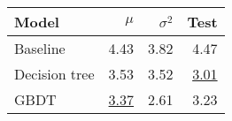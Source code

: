 \begin{tabular}{lrrr}
  \toprule
  Model         & $\mu$            & $\sigma^2$ & Test
  \\
  \midrule
  Baseline      & 4.43             & 3.82       & 4.47
  \\
  Decision tree & 3.53             & 3.52       & \underline{3.01}
  \\
  GBDT          & \underline{3.37} & 2.61       & 3.23
  \\
  \bottomrule
\end{tabular}
